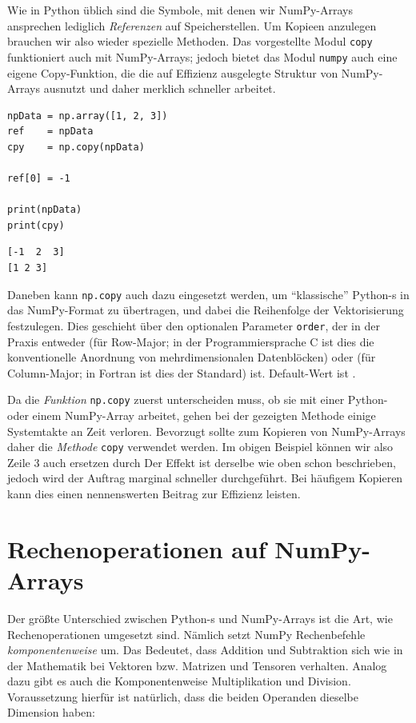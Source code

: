 Wie in Python üblich sind die Symbole, mit denen wir NumPy-Arrays ansprechen lediglich \emph{Referenzen} auf Speicherstellen. Um Kopieen anzulegen brauchen wir also wieder spezielle Methoden. Das vorgestellte Modul \texttt{copy} funktioniert auch mit NumPy-Arrays; jedoch bietet das Modul \texttt{numpy} auch eine eigene Copy-Funktion, die die auf Effizienz ausgelegte Struktur von NumPy-Arrays ausnutzt und daher merklich schneller arbeitet.

\begin{codebox}
\begin{verbatim}
npData = np.array([1, 2, 3])
ref    = npData
cpy    = np.copy(npData)

ref[0] = -1

print(npData)
print(cpy)
\end{verbatim}
\end{codebox}

\begin{cmdbox}
\begin{verbatim}
[-1  2  3]
[1 2 3]
\end{verbatim}
\end{cmdbox}

Daneben kann \texttt{np.copy} auch dazu eingesetzt werden, um \enquote{klassische} Python-s in das NumPy-Format zu übertragen, und dabei die Reihenfolge der Vektorisierung festzulegen. Dies geschieht über den optionalen Parameter \texttt{order}, der in der Praxis entweder  (für Row-Major; in der Programmiersprache C ist dies die konventionelle Anordnung von mehrdimensionalen Datenblöcken) oder  (für Column-Major; in Fortran ist dies der Standard) ist. Default-Wert ist .

Da die \emph{Funktion} \texttt{np.copy} zuerst unterscheiden muss, ob sie mit einer Python- oder einem NumPy-Array arbeitet, gehen bei der gezeigten Methode einige Systemtakte an Zeit verloren. Bevorzugt sollte zum Kopieren von NumPy-Arrays daher die \emph{Methode} \texttt{copy} verwendet werden. Im obigen Beispiel können wir also Zeile 3 auch ersetzen durch
Der Effekt ist derselbe wie oben schon beschrieben, jedoch wird der Auftrag marginal schneller durchgeführt. Bei häufigem Kopieren kann dies einen nennenswerten Beitrag zur Effizienz leisten.

\section{Rechenoperationen auf NumPy-Arrays}
Der größte Unterschied zwischen Python-s und NumPy-Arrays ist die Art, wie Rechenoperationen umgesetzt sind. Nämlich setzt NumPy Rechenbefehle \emph{komponentenweise} um. Das Bedeutet, dass Addition und Subtraktion sich wie in der Mathematik bei Vektoren bzw. Matrizen und Tensoren verhalten. Analog dazu gibt es auch die Komponentenweise Multiplikation und Division. Voraussetzung hierfür ist natürlich, dass die beiden Operanden dieselbe Dimension haben:

